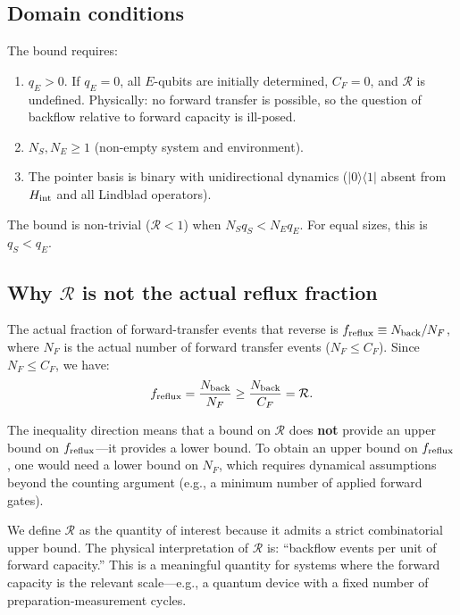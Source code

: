 \documentclass[aps,prl,onecolumn]{revtex4-2}
\begin{document}
\subsection{Domain conditions}

The bound requires:
\begin{enumerate}
\item $q_E > 0$. If $q_E = 0$, all $E$-qubits are initially determined, $C_F = 0$, and $\mathcal{R}$ is undefined. Physically: no forward transfer is possible, so the question of backflow relative to forward capacity is ill-posed.
\item $N_S, N_E \geq 1$ (non-empty system and environment).
\item The pointer basis is binary with unidirectional dynamics ($|0\rangle\langle 1|$ absent from $H_{\rm int}$ and all Lindblad operators).
\end{enumerate}

The bound is non-trivial ($\mathcal{R} < 1$) when $N_S q_S < N_E q_E$. For equal sizes, this is $q_S < q_E$.

\subsection{Why $\mathcal{R}$ is not the actual reflux fraction}

The actual fraction of forward-transfer events that reverse is $f_{\rm reflux} \equiv N_{\rm back}/N_F$, where $N_F$ is the actual number of forward transfer events ($N_F \leq C_F$). Since $N_F \leq C_F$, we have:
\begin{equation}
f_{\rm reflux} = \frac{N_{\rm back}}{N_F} \geq \frac{N_{\rm back}}{C_F} = \mathcal{R}.
\end{equation}

The inequality direction means that a bound on $\mathcal{R}$ does \textbf{not} provide an upper bound on $f_{\rm reflux}$---it provides a lower bound. To obtain an upper bound on $f_{\rm reflux}$, one would need a lower bound on $N_F$, which requires dynamical assumptions beyond the counting argument (e.g., a minimum number of applied forward gates).

We define $\mathcal{R}$ as the quantity of interest because it admits a strict combinatorial upper bound. The physical interpretation of $\mathcal{R}$ is: ``backflow events per unit of forward capacity.'' This is a meaningful quantity for systems where the forward capacity is the relevant scale---e.g., a quantum device with a fixed number of preparation-measurement cycles.
\end{document}
